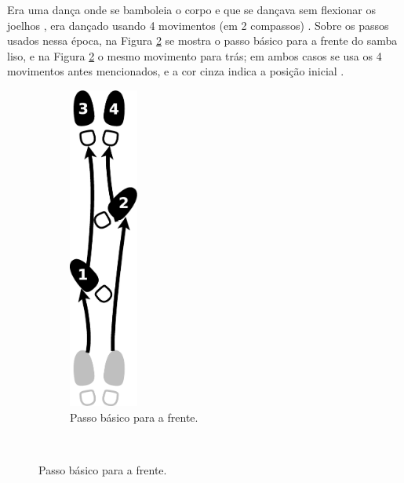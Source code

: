 
Era uma dança onde se bamboleia o corpo e que se dançava sem flexionar os joelhos \cite[pp. 58]{freitas1959danca} \cite[pp. 143]{perna2002samba},
era dançado usando 4 movimentos (em 2 compassos) \cite[pp. 62]{freitas1959danca} \cite[pp. 143]{perna2002samba}.
Sobre os passos usados nessa época, 
na Figura \ref{fig:samba-liso-basico-frente} se mostra o passo básico para a frente do samba liso,
e na  Figura \ref{fig:samba-liso-basico-frente} o mesmo movimento para trás; 
em ambos casos se usa os 4 movimentos antes mencionados, e a cor cinza indica a posição inicial \cite[pp. 63]{freitas1959danca}. 
\begin{figure}[h]
    \centering
    \begin{subfigure}[b]{0.4\textwidth}
        \centering
        \includegraphics[width=0.25\textwidth]{chapters/cap-historia-dancasamba/samba-liso-basico-frente.eps}
        \caption{Passo básico para a frente.}
        \label{fig:samba-liso-basico-frente}
    \end{subfigure}
    ~ %

\end{figure}
